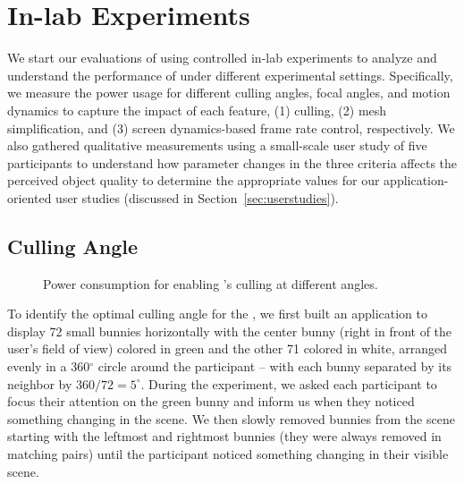 \section{In-lab Experiments}
\label{sec:inlab}


We start our evaluations of {\myit} using controlled in-lab experiments to  analyze and understand the performance of {\myit} under  different experimental settings. Specifically, we measure the power usage for different culling angles, 
focal angles, and motion dynamics to capture the impact of each {\myit} feature,
(1) culling, (2) mesh simplification, and (3) screen dynamics-based frame rate 
control, respectively. We also gathered qualitative measurements using a small-scale user study of five participants to understand how parameter changes in the three  criteria affects the perceived object quality to determine the appropriate values for our application-oriented user studies (discussed in Section~\ref{sec:userstudies}). 



\subsection{Culling Angle}

\begin{figure}[t]
    \centering
    \vspace{-1ex}
    \vspace{-2ex}
    \caption{Power consumption for enabling
            {\myit}'s culling at different angles.}
    \label{fig:lpgl-cullingangle-all}
\end{figure}


To identify the optimal culling angle for the {\mlo}, we first built an application to display 72 small bunnies horizontally with the center bunny (right in front of the user's field of view) colored in green and the other 71 colored in white, arranged evenly in a 360$^\circ$ circle around the participant -- with each bunny separated by its neighbor by $360/72=5^\circ$. During the experiment, we asked each participant to focus their attention on the green bunny and inform us when they noticed something changing in the scene. We then slowly removed bunnies from the scene starting with the leftmost and rightmost bunnies (they were always removed in matching pairs) until the participant noticed something changing in their visible scene.

